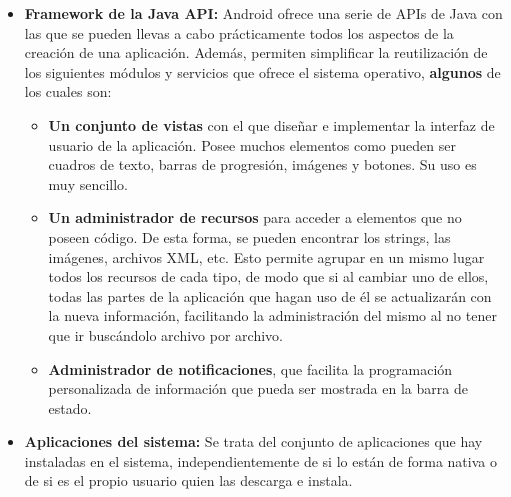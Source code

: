 \begin{itemize}
    \item \textbf{Framework de la Java API:} Android ofrece una serie de APIs de Java con las que se pueden llevas a cabo prácticamente todos los aspectos de la creación de una aplicación. Además, permiten simplificar la reutilización de los siguientes módulos y servicios que ofrece el sistema operativo, \textbf{algunos} de los cuales son:
    \begin{itemize}
        \item \textbf{Un conjunto de vistas} con el que diseñar e implementar la interfaz de usuario de la aplicación. Posee muchos elementos como pueden ser cuadros de texto, barras de progresión, imágenes y botones. Su uso es muy sencillo.
        \item \textbf{Un administrador de recursos} para acceder a elementos que no poseen código. De esta forma, se pueden encontrar los strings, las imágenes, archivos XML, etc. Esto permite agrupar en un mismo lugar todos los recursos de cada tipo, de modo que si al cambiar uno de ellos, todas las partes de la aplicación que hagan uso de él se actualizarán con la nueva información, facilitando la administración del mismo al no tener que ir buscándolo archivo por archivo.
        \item \textbf{Administrador de notificaciones}, que facilita la programación personalizada de información que pueda ser mostrada en la barra de estado.
    \end{itemize}
    
    \item \textbf{Aplicaciones del sistema:} Se trata del conjunto de aplicaciones que hay instaladas en el sistema, independientemente de si lo están de forma nativa o de si es el propio usuario quien las descarga e instala. 
\end{itemize}



